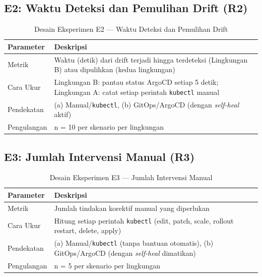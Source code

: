 \subsection{E2: Waktu Deteksi dan Pemulihan Drift (R2)}

\begin{table}[H]
  \centering
  \caption{Desain Eksperimen E2 --- Waktu Deteksi dan Pemulihan Drift}
  \label{tab:e2}
  \begin{tabular}{|l|p{9cm}|}
    \hline
    \textbf{Parameter} & \textbf{Deskripsi} \\
    \hline
    Metrik & Waktu (detik) dari drift terjadi hingga terdeteksi (Lingkungan B) atau dipulihkan (kedua lingkungan) \\
    \hline
    Cara Ukur & Lingkungan B: pantau status ArgoCD setiap 5 detik; Lingkungan A: catat setiap perintah \texttt{kubectl} manual \\
    \hline
    Pendekatan & (a) Manual/\texttt{kubectl}, (b) GitOps/ArgoCD (dengan \textit{self-heal} aktif) \\
    \hline
    Pengulangan & n = 10 per skenario per lingkungan \\
    \hline
  \end{tabular}
\end{table}

\subsection{E3: Jumlah Intervensi Manual (R3)}

\begin{table}[H]
  \centering
  \caption{Desain Eksperimen E3 --- Jumlah Intervensi Manual}
  \label{tab:e3}
  \begin{tabular}{|l|p{9cm}|}
    \hline
    \textbf{Parameter} & \textbf{Deskripsi} \\
    \hline
    Metrik & Jumlah tindakan korektif manual yang diperlukan \\
    \hline
    Cara Ukur & Hitung setiap perintah \texttt{kubectl} (edit, patch, scale, rollout restart, delete, apply) \\
    \hline
    Pendekatan & (a) Manual/\texttt{kubectl} (tanpa bantuan otomatis), (b) GitOps/ArgoCD (dengan \textit{self-heal} dimatikan) \\
    \hline
    Pengulangan & n = 5 per skenario per lingkungan \\
    \hline
  \end{tabular}
\end{table}

